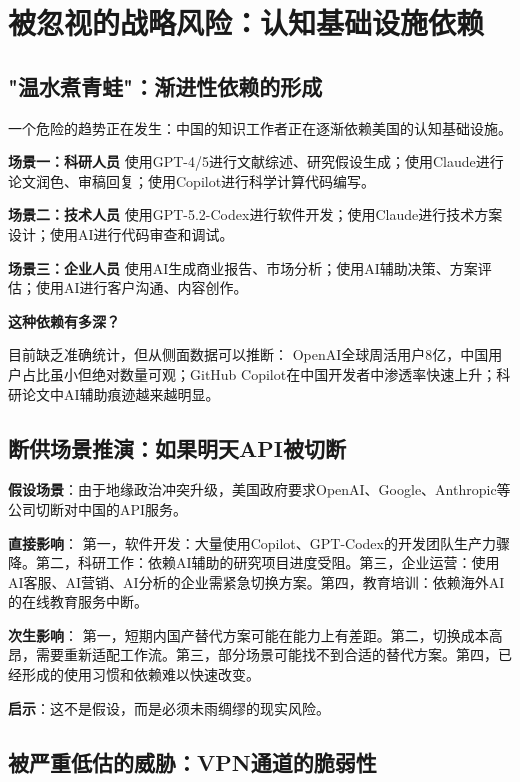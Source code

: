 \section{被忽视的战略风险：认知基础设施依赖}

\subsection{"温水煮青蛙"：渐进性依赖的形成}

一个危险的趋势正在发生：中国的知识工作者正在逐渐依赖美国的认知基础设施。

\textbf{场景一：科研人员}
使用GPT-4/5进行文献综述、研究假设生成；使用Claude进行论文润色、审稿回复；使用Copilot进行科学计算代码编写。

\textbf{场景二：技术人员}
使用GPT-5.2-Codex进行软件开发；使用Claude进行技术方案设计；使用AI进行代码审查和调试。

\textbf{场景三：企业人员}
使用AI生成商业报告、市场分析；使用AI辅助决策、方案评估；使用AI进行客户沟通、内容创作。

\textbf{这种依赖有多深？}

目前缺乏准确统计，但从侧面数据可以推断：
OpenAI全球周活用户8亿，中国用户占比虽小但绝对数量可观；GitHub Copilot在中国开发者中渗透率快速上升；科研论文中AI辅助痕迹越来越明显。

\subsection{断供场景推演：如果明天API被切断}

\textbf{假设场景}：由于地缘政治冲突升级，美国政府要求OpenAI、Google、Anthropic等公司切断对中国的API服务。

\textbf{直接影响}：
第一，软件开发：大量使用Copilot、GPT-Codex的开发团队生产力骤降。第二，科研工作：依赖AI辅助的研究项目进度受阻。第三，企业运营：使用AI客服、AI营销、AI分析的企业需紧急切换方案。第四，教育培训：依赖海外AI的在线教育服务中断。

\textbf{次生影响}：
第一，短期内国产替代方案可能在能力上有差距。第二，切换成本高昂，需要重新适配工作流。第三，部分场景可能找不到合适的替代方案。第四，已经形成的使用习惯和依赖难以快速改变。

\textbf{启示}：这不是假设，而是必须未雨绸缪的现实风险。

\subsection{被严重低估的威胁：VPN通道的脆弱性}

